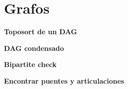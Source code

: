 \section{Grafos}
    \textbf{Toposort de un DAG}
    

    \textbf{DAG condensado}
    

    \textbf{Bipartite check}
    

    \textbf{Encontrar puentes y articulaciones}
    

    
